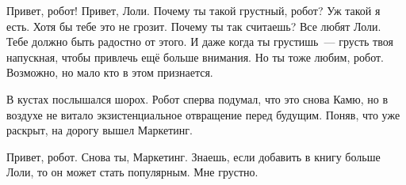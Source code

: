 \begin{dialog}
\X Привет, робот!
\R Привет, Лоли.
\X Почему ты такой грустный, робот?
\R Уж такой я есть. Хотя бы тебе это не грозит.
\X Почему ты так считаешь?
\R Все любят Лоли. Тебе должно быть радостно от этого. И даже когда ты грустишь~--- грусть твоя напускная, чтобы привлечь ещё больше внимания.
\X Но ты тоже любим, робот.
\R Возможно, но мало кто в этом признается.
\end{dialog}

\begin{monolog}
В кустах послышался шорох. Робот сперва подумал, что это снова Камю, но в воздухе не витало экзистенциальное отвращение перед будущим.
Поняв, что уже раскрыт, на дорогу вышел Маркетинг.
\end{monolog}

\begin{dialog}
\Y Привет, робот.
\R Снова ты, Маркетинг.
\Y Знаешь, если добавить в книгу больше Лоли, то он может стать популярным.
\R Мне грустно.
\end{dialog}